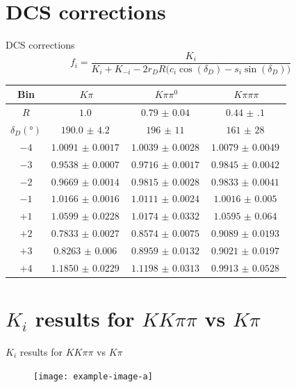 \documentclass{beamer}
\begin{document}
\section{DCS corrections}
\begin{frame}{DCS corrections}
  \begin{equation*}
    f_i = \frac{K_i}{K_i + K_{-i} - 2r_DR\big(c_i\cos(\delta_D) - s_i\sin(\delta_D)\big)}
  \end{equation*}
  \centering
  \def\arraystretch{1.2}%
  \begin{tabular}{c|ccc}
    Bin                         & $K\pi$               & $K\pi\pi^0$          & $K\pi\pi\pi$         \\
    \hline
    $R$                         & $\SI{1.0}{}$         & $\SI{0.79(4)}{}$     & $\SI{0.44(10)}{}$    \\
    $\delta_D(\si{\degree})$    & $\SI{190.0(42)}{}$   & $\SI{196(11)}{}$     & $\SI{161(28)}{}$     \\
    \hline
    $-4$                        & $\SI{1.0091(17)}{}$  & $\SI{1.0039(28)}{}$  & $\SI{1.0079(49)}{}$  \\
    $-3$                        & $\SI{0.9538(7)}{}$   & $\SI{0.9716(17)}{}$  & $\SI{0.9845(42)}{}$  \\
    $-2$                        & $\SI{0.9669(14)}{}$  & $\SI{0.9815(28)}{}$  & $\SI{0.9833(41)}{}$  \\
    $-1$                        & $\SI{1.0166(16)}{}$  & $\SI{1.0111(24)}{}$  & $\SI{1.0016(50)}{}$  \\
    $+1$                        & $\SI{1.0599(228)}{}$ & $\SI{1.0174(332)}{}$ & $\SI{1.0595(640)}{}$ \\
    $+2$                        & $\SI{0.7833(27)}{}$  & $\SI{0.8574(75)}{}$  & $\SI{0.9089(193)}{}$ \\
    $+3$                        & $\SI{0.8263(60)}{}$  & $\SI{0.8959(132)}{}$ & $\SI{0.9021(197)}{}$ \\
    $+4$                        & $\SI{1.1850(229)}{}$ & $\SI{1.1198(313)}{}$ & $\SI{0.9913(528)}{}$ \\
    \hline
  \end{tabular}
\end{frame}

\section{\texorpdfstring{$K_i$}{Ki} results for \texorpdfstring{$KK\pi\pi$}{KKpipi} vs \texorpdfstring{$K\pi$}{Kpi}}
\begin{frame}{$K_i$ results for $KK\pi\pi$ vs $K\pi$}
  \begin{figure}
    \centering
    \texttt{[image: example-image-a]}
  \end{figure}
\end{frame}
\end{document}
